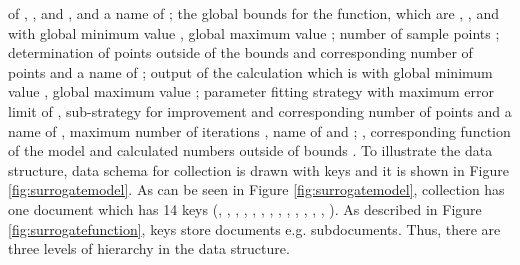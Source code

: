 {\initialPoints} of {\pZero}, {\rhoZero}, {\pOneByPzero} and {\diameter}, and a
name of {\fwname}; the global bounds for the function, {} which are
{\pZero}, {\rhoZero}, {\pOneByPzero} and {\diameter} with global minimum value
{\Min}, global maximum value {\Max}; number of sample points {\nSamples};
determination of points outside of the bounds {\outofBoundsStrategy} and
corresponding number of points {\nNewPoints} and a name of {\fwname}; output of
the calculation {\outputs} which is {\flowRate} with global minimum value
{\Min}, global maximum value {\Max}; parameter fitting strategy
{\ParameterfittingStrategy} with maximum error limit of {\maxerror},
sub-strategy for improvement {\improveErrorStrategy} and corresponding number of
points {\nNewPoints} and a name of {\fwname}, maximum number of iterations
{\maxIterations}, name of {\fwname} and {\testDataPercentage}; {\params},
corresponding function of the model {\surrFunction} and calculated numbers
outside of bounds {\outsidePoint}.  To illustrate the data structure, data
schema for {\surrogateModel} collection is drawn with keys and it is shown in
Figure \ref{fig:surrogatemodel}.
%
As can be seen in Figure \ref{fig:surrogatemodel}, {\surrogateModel}
collection has one document which has 14 keys ({\id}, {\fitData},
{\inheritedInputs}, {\initializationStrategy}, {\exactTask}, {\cls},
{}, {\nSamples}, {\surrFunction}, {\outputs},
{\outofBoundsStrategy}, {\params}, {\ParameterfittingStrategy},
{\outsidePoint}).  As described in Figure \ref{fig:surrogatefunction},
keys store documents e.g. subdocuments.  Thus, there are three levels
of hierarchy in the data structure.
